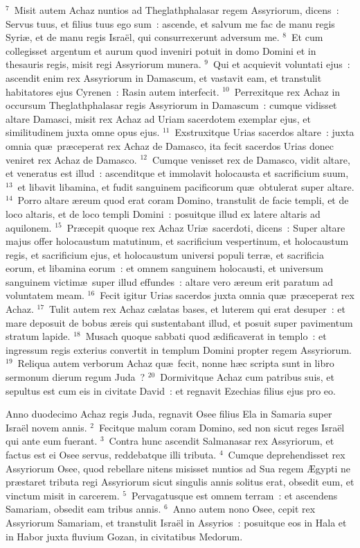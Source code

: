 ${}^{7}$~Misit autem Achaz nuntios ad Theglathphalasar regem Assyriorum, dicens~: Servus tuus, et filius tuus ego sum~: ascende, et salvum me fac de manu regis Syri\ae , et de manu regis Isra\"el, qui consurrexerunt adversum me.
${}^{8}$~Et cum collegisset argentum et aurum quod inveniri potuit in domo Domini et in thesauris regis, misit regi Assyriorum munera.
${}^{9}$~Qui et acquievit voluntati ejus~: ascendit enim rex Assyriorum in Damascum, et vastavit eam, et transtulit habitatores ejus Cyrenen~: Rasin autem interfecit.
${}^{10}$~Perrexitque rex Achaz in occursum Theglathphalasar regis Assyriorum in Damascum~: cumque vidisset altare Damasci, misit rex Achaz ad Uriam sacerdotem exemplar ejus, et similitudinem juxta omne opus ejus.
${}^{11}$~Exstruxitque Urias sacerdos altare~: juxta omnia qu\ae\ pr\ae ceperat rex Achaz de Damasco, ita fecit sacerdos Urias donec veniret rex Achaz de Damasco.
${}^{12}$~Cumque venisset rex de Damasco, vidit altare, et veneratus est illud~: ascenditque et immolavit holocausta et sacrificium suum,
${}^{13}$~et libavit libamina, et fudit sanguinem pacificorum qu\ae\ obtulerat super altare.
${}^{14}$~Porro altare \ae reum quod erat coram Domino, transtulit de facie templi, et de loco altaris, et de loco templi Domini~: posuitque illud ex latere altaris ad aquilonem.
${}^{15}$~Pr\ae cepit quoque rex Achaz Uri\ae\ sacerdoti, dicens~: Super altare majus offer holocaustum matutinum, et sacrificium vespertinum, et holocaustum regis, et sacrificium ejus, et holocaustum universi populi terr\ae , et sacrificia eorum, et libamina eorum~: et omnem sanguinem holocausti, et universum sanguinem victim\ae\ super illud effundes~: altare vero \ae reum erit paratum ad voluntatem meam.
${}^{16}$~Fecit igitur Urias sacerdos juxta omnia qu\ae\ pr\ae ceperat rex Achaz.
${}^{17}$~Tulit autem rex Achaz c\ae latas bases, et luterem qui erat desuper~: et mare deposuit de bobus \ae reis qui sustentabant illud, et posuit super pavimentum stratum lapide.
${}^{18}$~Musach quoque sabbati quod \ae dificaverat in templo~: et ingressum regis exterius convertit in templum Domini propter regem Assyriorum.
${}^{19}$~Reliqua autem verborum Achaz qu\ae\ fecit, nonne h\ae c scripta sunt in libro sermonum dierum regum Juda~?
${}^{20}$~Dormivitque Achaz cum patribus suis, et sepultus est cum eis in civitate David~: et regnavit Ezechias filius ejus pro eo.

\bchapter
\lettrine[lines=3,image=true,loversize=0.05,lraise=-0.03]{A}{}nno duodecimo Achaz regis Juda, regnavit Osee filius Ela in Samaria super Isra\"el novem annis.
${}^{2}$~Fecitque malum coram Domino, sed non sicut reges Isra\"el qui ante eum fuerant.
${}^{3}$~Contra hunc ascendit Salmanasar rex Assyriorum, et factus est ei Osee servus, reddebatque illi tributa.
${}^{4}$~Cumque deprehendisset rex Assyriorum Osee, quod rebellare nitens misisset nuntios ad Sua regem \AE gypti ne pr\ae staret tributa regi Assyriorum sicut singulis annis solitus erat, obsedit eum, et vinctum misit in carcerem.
${}^{5}$~Pervagatusque est omnem terram~: et ascendens Samariam, obsedit eam tribus annis.
${}^{6}$~Anno autem nono Osee, cepit rex Assyriorum Samariam, et transtulit Isra\"el in Assyrios~: posuitque eos in Hala et in Habor juxta fluvium Gozan, in civitatibus Medorum.


